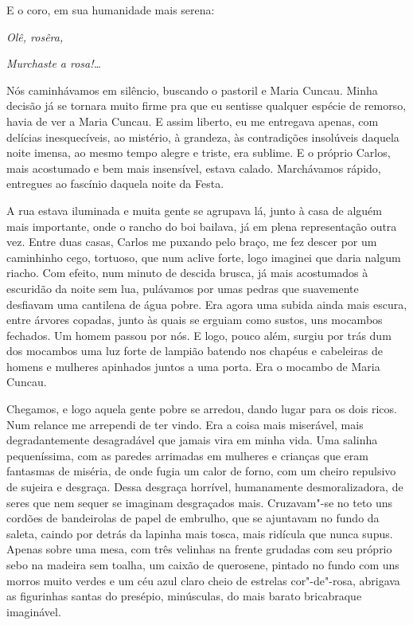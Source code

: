E o coro, em sua humanidade mais serena:

\emph{Olê, rosêra,}

\emph{Murchaste a rosa!\ldots{}}

Nós caminhávamos em silêncio, buscando o pastoril e Maria Cuncau. Minha
decisão já se tornara muito firme pra que eu sentisse qualquer espécie
de remorso, havia de ver a Maria Cuncau. E assim liberto, eu me
entregava apenas, com delícias inesquecíveis, ao mistério, à grandeza,
às contradições insolúveis daquela noite imensa, ao mesmo tempo alegre e
triste, era sublime. E o próprio Carlos, mais acostumado e bem mais
insensível, estava calado. Marchávamos rápido, entregues ao fascínio
daquela noite da Festa.

A rua estava iluminada e muita gente se agrupava lá, junto à casa de
alguém mais importante, onde o rancho do boi bailava, já em plena
representação outra vez. Entre duas casas, Carlos me puxando pelo braço,
me fez descer por um caminhinho cego, tortuoso, que num aclive forte,
logo imaginei que daria nalgum riacho. Com efeito, num minuto de descida
brusca, já mais acostumados à escuridão da noite sem lua, pulávamos por
umas pedras que suavemente desfiavam uma cantilena de água pobre. Era
agora uma subida ainda mais escura, entre árvores copadas, junto às
quais se erguiam como sustos, uns mocambos fechados. Um homem passou por
nós. E logo, pouco além, surgiu por trás dum dos mocambos uma luz forte
de lampião batendo nos chapéus e cabeleiras de homens e mulheres
apinhados juntos a uma porta. Era o mocambo de Maria Cuncau.

Chegamos, e logo aquela gente pobre se arredou, dando lugar para os dois
ricos. Num relance me arrependi de ter vindo. Era a coisa mais
miserável, mais degradantemente desagradável que jamais vira em minha
vida. Uma salinha pequeníssima, com as paredes arrimadas em mulheres e
crianças que eram fantasmas de miséria, de onde fugia um calor de forno,
com um cheiro repulsivo de sujeira e desgraça. Dessa desgraça horrível,
humanamente desmoralizadora, de seres que nem sequer se imaginam
desgraçados mais. Cruzavam"-se no teto uns cordões de bandeirolas de
papel de embrulho, que se ajuntavam no fundo da saleta, caindo por
detrás da lapinha mais tosca, mais ridícula que nunca supus. Apenas
sobre uma mesa, com três velinhas na frente grudadas com seu próprio
sebo na madeira sem toalha, um caixão de querosene, pintado no fundo com
uns morros muito verdes e um céu azul claro cheio de estrelas
cor"-de"-rosa, abrigava as figurinhas santas do presépio, minúsculas, do
mais barato bricabraque imaginável.

